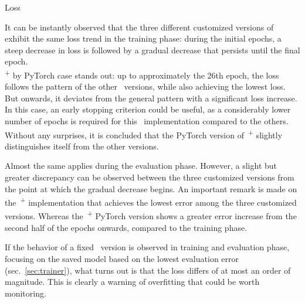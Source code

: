 \begin{subsection}{Loss}
    \begin{figure}[h!]
        \centering
        \begin{subfigure}[b]{0.48\textwidth}
            \centering
            
            \label{fig:training_loss}
        \end{subfigure}
        \hfill
        \begin{subfigure}[b]{0.48\textwidth}
            \centering
            
            \label{fig:evaluation_loss}
        \end{subfigure}
    \end{figure}
    \par It can be instantly observed that the three different customized versions of~ exhibit the same loss trend in the training phase: during the initial epochs, a steep decrease in loss is followed by a gradual decrease that persists until the final epoch.\\
    \textsuperscript{+} by PyTorch case stands out: up to approximately the 26th epoch, the loss follows the pattern of the other~ versions, while also achieving the lowest loss. But onwards, it deviates from the general pattern with a significant loss increase. In this case, an early stopping criterion could be useful, as a considerably lower number of epochs is required for this~ implementation compared to the others.
    Without any surprises, it is concluded that the PyTorch version of~\textsuperscript{+} slightly distinguishes itself from the other versions.\\
    \par Almost the same applies during the evaluation phase. However, a slight but greater discrepancy can be observed between the three customized versions from the point at which the gradual decrease begins. An important remark is made on the~\textsuperscript{+} implementation that achieves the lowest error among the three customized versions. Whereas the~\textsuperscript{+} PyTorch version shows a greater error increase from the second half of the epochs onwards, compared to the training phase.\\
    \par If the behavior of a fixed~ version is observed in training and evaluation phase, focusing on the saved model based on the lowest evaluation error (sec.~\ref{sec:trainer}), what turns out is that the loss differs of at most an order of magnitude. This is clearly a warning of overfitting that could be worth monitoring.
\end{subsection}
\clearpage
